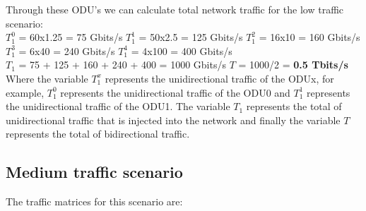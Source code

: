 \vspace{17pt}
Through these ODU's we can calculate total network traffic for the low traffic scenario:\\

$T_1^0$ = 60x1.25 = 75 Gbits/s \qquad
$T_1^1$ = 50x2.5 = 125 Gbits/s \qquad
$T_1^2$ = 16x10 = 160 Gbits/s \\

$T_1^3$ = 6x40 = 240 Gbits/s \quad
$T_1^4$ = 4x100 = 400 Gbits/s \\

$T_{1}$ = 75 + 125 + 160 + 240 + 400 = 1000 Gbits/s \qquad
$T$ = 1000/2 = \textbf{0.5 Tbits/s}\\

Where the variable $T_1^x$ represents the unidirectional traffic of the ODUx, for example, $T_1^0$ represents the unidirectional traffic of the ODU0 and $T_1^1$ represents the unidirectional traffic of the ODU1. The variable $T_{1}$ represents the total of unidirectional traffic that is injected into the network and finally the variable $T$ represents the total of bidirectional traffic.\\

\subsection{Medium traffic scenario}\label{medium_traffic_scenario}

The traffic matrices for this scenario are:

